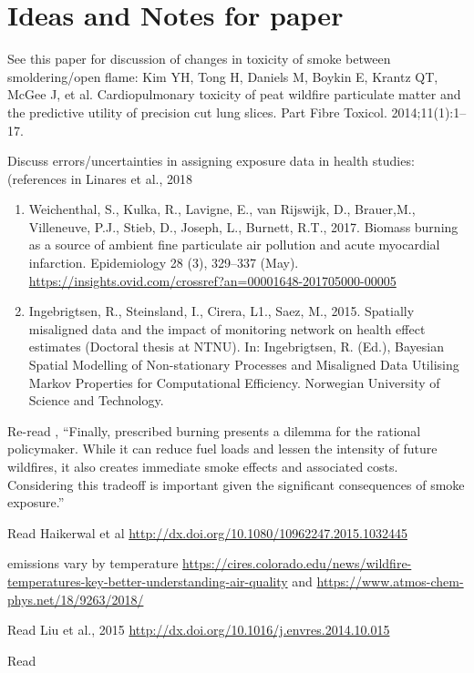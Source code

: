 \section{Ideas and Notes for paper}

See this paper for discussion of changes in toxicity of smoke between smoldering/open flame: Kim YH, Tong H, Daniels M, Boykin E, Krantz QT, McGee J, et al.
Cardiopulmonary toxicity of peat wildfire particulate matter and the predictive
utility of precision cut lung slices. Part Fibre Toxicol. 2014;11(1):1–17.

Discuss errors/uncertainties in assigning exposure data in health studies: (references in Linares et al., 2018 \cite{linares_impact_2018}
\begin{enumerate}
\item Weichenthal, S., Kulka, R., Lavigne, E., van Rijswijk, D., Brauer,M., Villeneuve, P.J., Stieb, D.,
Joseph, L., Burnett, R.T., 2017. Biomass burning as a source of ambient fine particulate
air pollution and acute myocardial infarction. Epidemiology 28 (3), 329–337 (May). \url{https://insights.ovid.com/crossref?an=00001648-201705000-00005}

\item Ingebrigtsen, R., Steinsland, I., Cirera, L1., Saez, M., 2015. Spatially misaligned data and the
impact of monitoring network on health effect estimates (Doctoral thesis at NTNU).
In: Ingebrigtsen, R. (Ed.), Bayesian Spatial Modelling of Non-stationary Processes
and Misaligned Data Utilising Markov Properties for Computational Efficiency. Norwegian
University of Science and Technology. 
\end{enumerate}

Re-read \cite{jones_application_2017}, ``Finally, prescribed burning presents a dilemma for the rational policymaker. While it can reduce fuel loads and lessen the intensity of future wildfires, it also creates immediate smoke effects and associated costs. Considering this tradeoff is important given the significant consequences of smoke exposure.''

Read Haikerwal et al \url{http://dx.doi.org/10.1080/10962247.2015.1032445}

emissions vary by temperature \url{https://cires.colorado.edu/news/wildfire-temperatures-key-better-understanding-air-quality} and \url{https://www.atmos-chem-phys.net/18/9263/2018/}

Read Liu et al., 2015 \url{http://dx.doi.org/10.1016/j.envres.2014.10.015}

Read \cite{liu_wildfire-specific_2016}

